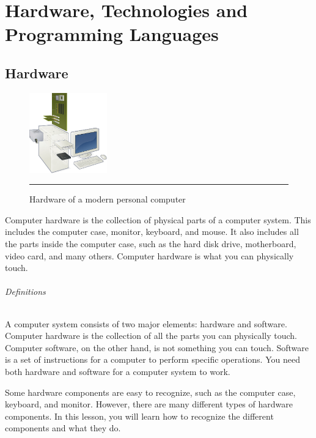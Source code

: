 
\chapter{Hardware, Technologies and Programming Languages} %

\label{Chapter2} %



\section{Hardware}
\begin{figure}
  \begin{center}
    \includegraphics[width=0.3\textwidth]{./Pictures/hardware.jpg}
  \end{center}
  \rule{0.3\textwidth}{0.5pt}
  \caption{Hardware of a modern personal computer}
  \label{fig:hardware}
\end{figure}

Computer hardware is the collection of physical parts of a computer system. This includes the computer case, monitor, keyboard, and mouse. It also includes all the parts inside the computer case, such as the hard disk drive, motherboard, video card, and many others. Computer hardware is what you can physically touch.\cite{10}
\subparagraph*{Definitions}
\hfill \break
A computer system consists of two major elements: hardware and software. Computer hardware is the collection of all the parts you can physically touch. Computer software, on the other hand, is not something you can touch. Software is a set of instructions for a computer to perform specific operations. You need both hardware and software for a computer system to work.

Some hardware components are easy to recognize, such as the computer case, keyboard, and monitor. However, there are many different types of hardware components. In this lesson, you will learn how to recognize the different components and what they do.\cite{10}

